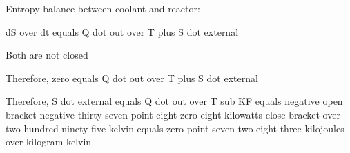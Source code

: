Entropy balance between coolant and reactor:

dS over dt equals Q dot out over T plus S dot external

Both are not closed

Therefore, zero equals Q dot out over T plus S dot external

Therefore, S dot external equals Q dot out over T sub KF equals negative open bracket negative thirty-seven point eight zero eight kilowatts close bracket over two hundred ninety-five kelvin equals zero point seven two eight three kilojoules over kilogram kelvin